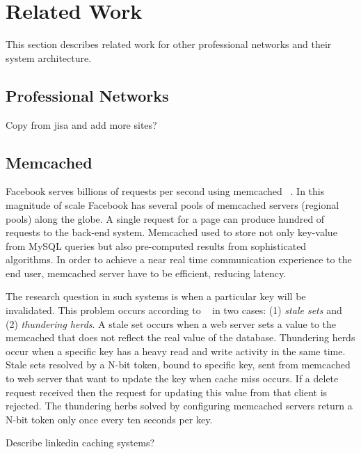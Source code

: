 \section{Related Work}
This section describes related work for other professional networks and their system architecture.

\subsection{Professional Networks}
{\color{red}Copy from jisa and add more sites?}

\subsection{Memcached}
Facebook serves billions of requests per second using memcached ~\cite{nishtala2013scaling}. In this magnitude of scale Facebook has several pools of memcached servers (regional pools) along the globe. A single request for a page can produce hundred of requests to the back-end system. Memcached used to store not only key-value from MySQL queries but also pre-computed results from sophisticated algorithms. 
In order to achieve a near real time communication experience to the end user, memcached server have to be efficient, reducing latency. 

The research question in such systems is when a particular key will be invalidated. This problem occurs according to ~\cite{nishtala2013scaling} in two cases: (1) \emph{stale sets} and (2) \emph{thundering herds}. A stale set occurs when a web server sets a value to the memcached that does not reflect the real value of the database. Thundering herds occur when a specific key has a heavy read and write activity in the same time. Stale sets resolved by a N-bit token, bound to specific key, sent from memcached to web server that want to update the key when cache miss occurs. If a delete request received then the request for updating this value from that client is rejected. The thundering herbs solved by configuring memcached servers return a N-bit token only once every ten seconds per key.

{\color{red}Describe linkedin caching systems?}
 
